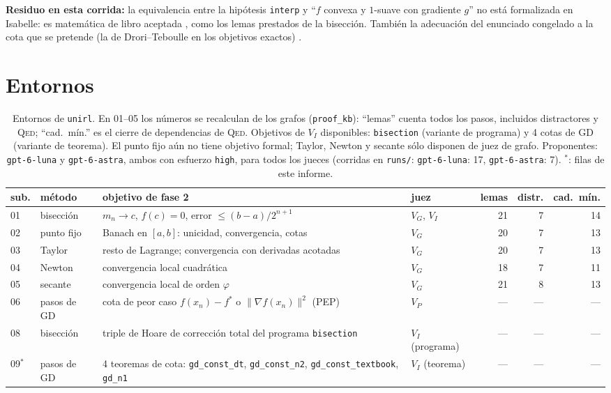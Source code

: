 \documentclass[11pt,a4paper]{article}
\begin{document}
\textbf{Residuo en esta corrida:} la equivalencia entre la hipótesis \texttt{interp} y ``$f$ convexa y $1$-suave con gradiente $g$'' no está formalizada en Isabelle: es matemática de libro aceptada \citep{Nesterov2018}, como los lemas prestados de la bisección. También la adecuación del enunciado congelado a la cota que se pretende (la de Drori--Teboulle en los objetivos exactos) \citep{DroriTeboulle2014}.

\section{Entornos}

\begin{table}[!ht]
\centering
\footnotesize
\begin{tabular}{@{}llp{5.0cm}lrrr@{}}
\toprule
sub. & método & objetivo de fase 2 & juez & lemas & distr. & cad.\ mín. \\
\midrule
01 & bisección & $m_n \to c$, $f(c)=0$, error $\le (b-a)/2^{n+1}$ & $V_G$, $V_I$ & 21 & 7 & 14 \\
02 & punto fijo & Banach en $[a,b]$: unicidad, convergencia, cotas & $V_G$ & 20 & 7 & 13 \\
03 & Taylor & resto de Lagrange; convergencia con derivadas acotadas & $V_G$ & 20 & 7 & 13 \\
04 & Newton & convergencia local cuadrática & $V_G$ & 18 & 7 & 11 \\
05 & secante & convergencia local de orden $\varphi$ & $V_G$ & 21 & 8 & 13 \\
06 & pasos de GD & cota de peor caso $f(x_n)-f^*$ o $\|\nabla f(x_n)\|^2$ (PEP) & $V_P$ & --- & --- & --- \\
08 & bisección & triple de Hoare de corrección total del programa \texttt{bisection} & $V_I$ (programa) & --- & --- & --- \\
09$^\ast$ & pasos de GD & 4 teoremas de cota: \texttt{gd\_\allowbreak{}const\_\allowbreak{}dt}, \texttt{gd\_\allowbreak{}const\_\allowbreak{}n2}, \texttt{gd\_\allowbreak{}const\_\allowbreak{}textbook}, \texttt{gd\_\allowbreak{}n1} & $V_I$ (teorema) & --- & --- & --- \\
\bottomrule
\end{tabular}
\caption{Entornos de \texttt{unirl}. En 01--05 los números se recalculan de los grafos (\texttt{proof\_kb}): ``lemas'' cuenta todos los pasos, incluidos distractores y \textsc{Qed}; ``cad.\ mín.'' es el cierre de dependencias de \textsc{Qed}. Objetivos de $V_I$ disponibles: \texttt{bisection} (variante de programa) y 4 cotas de GD (variante de teorema). El punto fijo aún no tiene objetivo formal; Taylor, Newton y secante sólo disponen de juez de grafo. Proponentes: \texttt{gpt-6-luna} y \texttt{gpt-6-astra}, ambos con esfuerzo \texttt{high}, para todos los jueces (corridas en \texttt{runs/}: \texttt{gpt-\allowbreak{}6-\allowbreak{}luna}: 17, \texttt{gpt-\allowbreak{}6-\allowbreak{}astra}: 7). $^\ast$: filas de este informe.}
\label{tab:envs}
\end{table}
\end{document}
